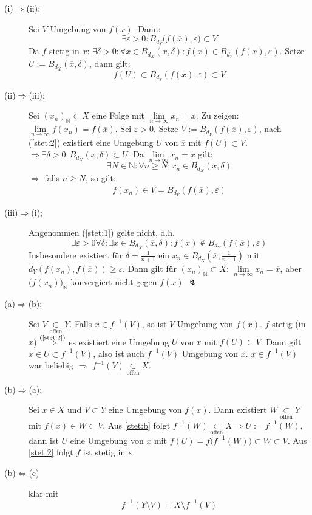 \begin{description}
	\item[(i)$\Rightarrow$(ii):] Sei $V$ Umgebung von $f(\overline{x})$. Dann: 
	\[
		\exists \varepsilon >0 : B_{d_Y} \big( f(\overline{x}) , \varepsilon\big) \subset V
	\]
	Da $f$ stetig in $\overline{x}$: $\exists \delta >0 : \forall x \in B_{d_X} ( \overline{x}, \delta  ) : f(x) \in B_{d_Y}(f(\overline{x}), \varepsilon)$.
	Setze $U:= B_{d_X} ( \overline{x}, \delta)$, dann gilt:
	\[
		f(U) \subset B_{d_Y} ( f(\overline{x}), \varepsilon) \subset V \tag*{$\square$}
	\]
	\item[(ii)$\Rightarrow$(iii):] Sei $(x_n)_\mathds{N} \subset X$ eine Folge mit $\lim\limits_{ n \to \infty} x_n = \overline{x} $. Zu zeigen: 
	$\lim\limits_{ n \to \infty} f(x_n) = f(\overline{x})$. Sei $\varepsilon >0$. Setze $V:= B_{d_Y}( f(\overline{x}), \varepsilon)$, nach (\ref{stet:2}) existiert
	eine Umgebung $U$ von $\overline{x}$ mit $f(U) \subset V$. $\Rightarrow \exists \delta  >0 : B_{d_X} ( \overline{x}, \delta ) \subset U$. Da 
	$\lim\limits_{ n \to \infty}  x_n = \overline{x} $ gilt: 
	\[
		\exists N \in \mathds{N} : \forall n \ge N : x_n \in B_{d_X} ( \overline{x}, \delta)
	\]
	$\Rightarrow$ falls $n \ge N$, so gilt: 
	\begin{align*}
		f(x_n) \in V = B_{d_Y} ( f(\overline{x}), \varepsilon) \tag*{$\square$}
	\end{align*}
	\item[(iii)$\Rightarrow$(i);] Angenommen (\ref{stet:1}) gelte nicht, d.h.
	\[
		\exists \varepsilon >0 \forall \delta : \exists x \in B_{d_X}(\overline{x}, \delta ) : f(x) \not\in B_{d_Y} (f(\overline{x}), \varepsilon)
	\]
	Insbesondere existiert für $\delta = \frac{1}{n+1} $ ein $x_n \in B_{d_X}( \overline{x}, \frac{1}{n+1} )$ mit $d_Y(f(x_n), f(\overline{x})) \ge \varepsilon$.
	Dann gilt für $(x_n)_\mathds{N} \subset X$: $\lim\limits_{ n \to \infty} x_n = \overline{x}$, aber $\big(f(x_n)\big)_{\mathds{N}}$ konvergiert nicht gegen 
	$f(\overline{x})$ {\large $\lightning$}
	\item[(a)$\Rightarrow$(b):] Sei $V \underset{\text{offen}}{\subset} Y$. Falls $x \in f^{-1} (V)$, so ist $V$ Umgebung von $f(x)$. $f$ stetig (in $x$) 
	$\overset{\text{(\ref{stet:2})}}{\Rightarrow}$ es existiert eine Umgebung $U$ von $x$ mit $f(U) \subset V$. Dann gilt $x \in U  \subset f^{-1}(V)$, also ist auch 
	$f ^{-1}(V)$ Umgebung von $x$. $x \in f ^{-1}(V)$ war beliebig $\Rightarrow$ $f ^{-1}(V) \underset{\text{offen}}{\subset} X$. \bewende
	\item[(b)$\Rightarrow$(a):] Sei $x \in X$ und $V \subset Y$ eine Umgebung von $f(x)$. Dann existiert $W \underset{\text{offen}}{\subset} Y$ mit 
	$f(x) \in W  \subset V$. Aus \ref{stet:b} folgt $f ^{-1} (W) \underset{\text{offen}}{\subset} X \Rightarrow U := f ^{-1} (W)$, dann ist $U$ eine Umgebung von $x$
	mit $f(U)= f \big( f ^{-1} (W) \big) \subset W \subset V$. Aus \ref{stet:2} folgt $f$ ist stetig in x.
	\item[(b)$\Leftrightarrow$(c)] klar mit 
	\[
		f ^{-1} ( Y \setminus V) = X \setminus f ^{-1} (V)
	\]
\end{description}

